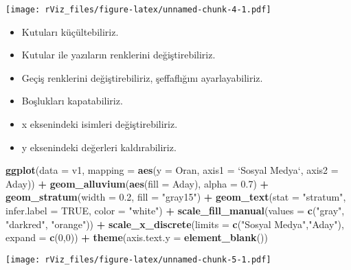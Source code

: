 \documentclass[
]{book}
\newenvironment{Shaded}{\begin{snugshade}}{\end{snugshade}}
\newcommand{\DataTypeTok}[1]{\textcolor[rgb]{0.13,0.29,0.53}{#1}}
\newcommand{\DecValTok}[1]{\textcolor[rgb]{0.00,0.00,0.81}{#1}}
\newcommand{\FloatTok}[1]{\textcolor[rgb]{0.00,0.00,0.81}{#1}}
\newcommand{\KeywordTok}[1]{\textcolor[rgb]{0.13,0.29,0.53}{\textbf{#1}}}
\newcommand{\NormalTok}[1]{#1}
\newcommand{\OperatorTok}[1]{\textcolor[rgb]{0.81,0.36,0.00}{\textbf{#1}}}
\newcommand{\OtherTok}[1]{\textcolor[rgb]{0.56,0.35,0.01}{#1}}
\newcommand{\StringTok}[1]{\textcolor[rgb]{0.31,0.60,0.02}{#1}}
\begin{document}
\texttt{[image: rViz\_files/figure-latex/unnamed-chunk-4-1.pdf]}

\begin{itemize}
\item
  Kutuları küçültebiliriz.
\item
  Kutular ile yazıların renklerini değiştirebiliriz.
\item
  Geçiş renklerini değiştirebiliriz, şeffaflığını ayarlayabiliriz.
\item
  Boşlukları kapatabiliriz.
\item
  x eksenindeki isimleri değiştirebiliriz.
\item
  y eksenindeki değerleri kaldırabiliriz.
\end{itemize}

\begin{Shaded}
\begin{Highlighting}[]
\KeywordTok{ggplot}\NormalTok{(}\DataTypeTok{data =}\NormalTok{ v1, }\DataTypeTok{mapping =} \KeywordTok{aes}\NormalTok{(}\DataTypeTok{y =}\NormalTok{ Oran, }\DataTypeTok{axis1 =} \StringTok{`}\DataTypeTok{Sosyal Medya}\StringTok{`}\NormalTok{, }\DataTypeTok{axis2 =}\NormalTok{ Aday)) }\OperatorTok{+}
\StringTok{  }\KeywordTok{geom_alluvium}\NormalTok{(}\KeywordTok{aes}\NormalTok{(}\DataTypeTok{fill =}\NormalTok{ Aday), }\DataTypeTok{alpha =} \FloatTok{0.7}\NormalTok{) }\OperatorTok{+}
\StringTok{  }\KeywordTok{geom_stratum}\NormalTok{(}\DataTypeTok{width =} \FloatTok{0.2}\NormalTok{, }\DataTypeTok{fill =} \StringTok{"gray15"}\NormalTok{) }\OperatorTok{+}
\StringTok{  }\KeywordTok{geom_text}\NormalTok{(}\DataTypeTok{stat =} \StringTok{"stratum"}\NormalTok{, }\DataTypeTok{infer.label =} \OtherTok{TRUE}\NormalTok{, }\DataTypeTok{color =} \StringTok{"white"}\NormalTok{) }\OperatorTok{+}
\StringTok{  }\KeywordTok{scale_fill_manual}\NormalTok{(}\DataTypeTok{values =} \KeywordTok{c}\NormalTok{(}\StringTok{"gray"}\NormalTok{, }\StringTok{"darkred"}\NormalTok{, }\StringTok{"orange"}\NormalTok{)) }\OperatorTok{+}
\StringTok{  }\KeywordTok{scale_x_discrete}\NormalTok{(}\DataTypeTok{limits =} \KeywordTok{c}\NormalTok{(}\StringTok{"Sosyal Medya"}\NormalTok{,}\StringTok{"Aday"}\NormalTok{), }\DataTypeTok{expand =} \KeywordTok{c}\NormalTok{(}\DecValTok{0}\NormalTok{,}\DecValTok{0}\NormalTok{)) }\OperatorTok{+}
\StringTok{  }\KeywordTok{theme}\NormalTok{(}\DataTypeTok{axis.text.y =} \KeywordTok{element_blank}\NormalTok{())}
\end{Highlighting}
\end{Shaded}

\texttt{[image: rViz\_files/figure-latex/unnamed-chunk-5-1.pdf]}
\end{document}

